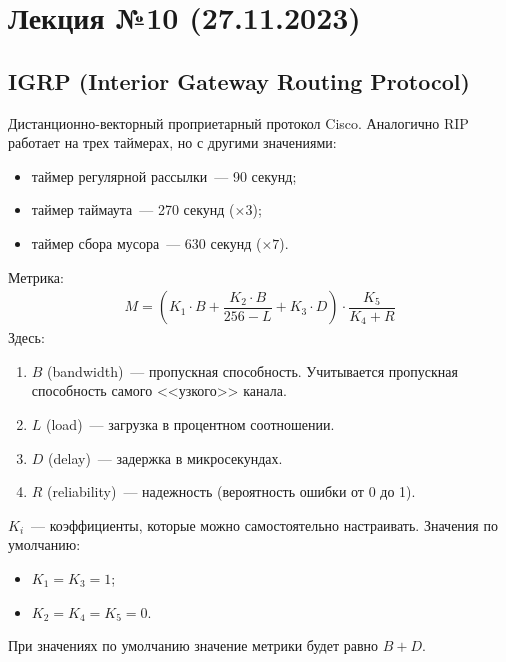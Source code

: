 \section{Лекция №10 (27.11.2023)}

\subsection{IGRP (Interior Gateway Routing Protocol)}

Дистанционно-векторный проприетарный протокол Cisco. Аналогично RIP работает на трех таймерах, но с другими значениями:

\begin{itemize}
    \item таймер регулярной рассылки~--- 90 секунд;
    \item таймер таймаута~--- 270 секунд ($\times 3$);
    \item таймер сбора мусора~--- 630 секунд ($\times 7$).
\end{itemize}

Метрика:
%
\begin{gather*}
    M = \left(K_1\cdot B + \dfrac{K_2\cdot B}{256 - L} + K_3\cdot D\right)\cdot \dfrac{K_5}{K_4 + R}
\end{gather*}
%
Здесь:

\begin{enumerate}
    \item $B$ (bandwidth)~--- пропускная способность. Учитывается пропускная способность самого <<узкого>> канала.
    \item $L$ (load)~--- загрузка в процентном соотношении.
    \item $D$ (delay)~--- задержка в микросекундах.
    \item $R$ (reliability)~--- надежность (вероятность ошибки от 0 до 1).
\end{enumerate}

$K_i$~--- коэффициенты, которые можно самостоятельно настраивать. Значения по умолчанию:

\begin{itemize}
    \item $K_1 = K_3 = 1$;
    \item $K_2 = K_4 = K_5 = 0$.
\end{itemize}

При значениях по умолчанию значение метрики будет равно ${B + D}$.

